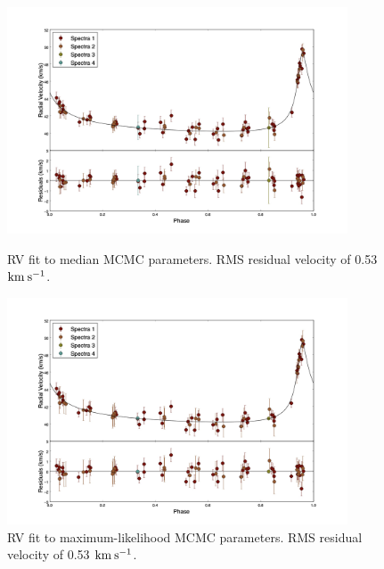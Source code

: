 \documentclass{article}
\begin{document}
\begin{figure}[!htb]
\centering
\includegraphics[width=0.9\textwidth]{RVfit_meds_100000_errorMult.jpg}
\caption{RV fit to median MCMC parameters. RMS residual velocity of 0.53 $\rm{km \: s^{-1}}$.}

\includegraphics[width=0.9\textwidth]{RVfit_best_100000_errorMult.jpg}
\caption{RV fit to maximum-likelihood MCMC parameters. RMS residual velocity of 0.53 $\rm{km \: s^{-1}}$.}
\end{figure}
\end{document}
